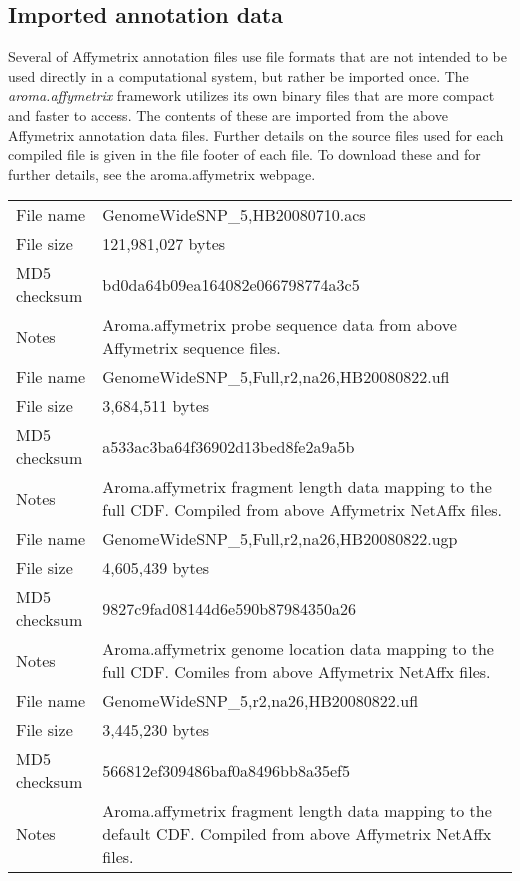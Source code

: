 \documentclass[10pt,a4paper]{article}
\newcommand{\pkg}[1]{\textit{#1}\xspace}
\begin{document}
\subsection{Imported annotation data}
Several of Affymetrix annotation files use file formats that are not intended to be used directly in a computational system, but rather be imported once.  The \pkg{aroma.affymetrix} framework utilizes its own binary files that are more compact and faster to access.  The contents of these are imported from the above Affymetrix annotation data files.  Further details on the source files used for each compiled file is given in the file footer of each file.  To download these and for further details, see the aroma.affymetrix webpage.

\begin{table}[htp]
\begin{center}
\begin{tabular}{lp{}}
\hline
File name    & GenomeWideSNP\_5,HB20080710.acs \\
File size    & 121,981,027 bytes \\
MD5 checksum & bd0da64b09ea164082e066798774a3c5 \\
Notes        & Aroma.affymetrix probe sequence data from above Affymetrix sequence files. \\
\hline
File name    & GenomeWideSNP\_5,Full,r2,na26,HB20080822.ufl \\
File size    & 3,684,511 bytes \\
MD5 checksum & a533ac3ba64f36902d13bed8fe2a9a5b \\
Notes        & Aroma.affymetrix fragment length data mapping to the full CDF.  Compiled from above Affymetrix NetAffx files. \\
\hline
File name    & GenomeWideSNP\_5,Full,r2,na26,HB20080822.ugp \\
File size    & 4,605,439 bytes \\
MD5 checksum & 9827c9fad08144d6e590b87984350a26 \\
Notes        & Aroma.affymetrix genome location data mapping to the full CDF.  Comiles from above Affymetrix NetAffx files. \\
\hline
File name    & GenomeWideSNP\_5,r2,na26,HB20080822.ufl \\
File size    & 3,445,230 bytes \\
MD5 checksum & 566812ef309486baf0a8496bb8a35ef5 \\
Notes        & Aroma.affymetrix fragment length data mapping to the default CDF.  Compiled from above Affymetrix NetAffx files. \\

\end{tabular}
\end{center}
\end{table}
\end{document}
